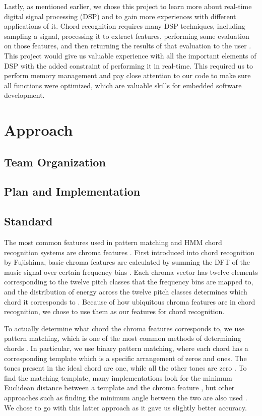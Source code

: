 \documentclass[journal]{IEEEtran}
\begin{document}
Lastly, as mentioned earlier, we chose this project to learn more about real-time digital signal processing (DSP) and to gain more experiences with different applications of it.
Chord recognition requires many DSP techniques, including sampling a signal, processing it to extract features, performing some evaluation on those features, and then returning the results of that evaluation to the user \cite{fujishima}.
This project would give us valuable experience with all the important elements of DSP with the added constraint of performing it in real-time.
This required us to perform memory management and pay close attention to our code to make sure all functions were optimized, which are valuable skills for embedded software development.

\section{Approach}
\subsection{Team Organization}

\subsection{Plan and Implementation}

\subsection{Standard}
The most common features used in pattern matching and HMM chord recognition systems are chroma features \cite{cho_chroma}.
First introduced into chord recognition by Fujishima, basic chroma features are calculated by summing the DFT of the music signal over certain frequency bins \cite{fujishima}.
Each chroma vector has twelve elements corresponding to the twelve pitch classes that the frequency bins are mapped to, and the distribution of energy across the twelve pitch classes determines which chord it corresponds to \cite{jiang}.
Because of how ubiquitous chroma features are in chord recognition, we chose to use them as our features for chord recognition.

To actually determine what chord the chroma features corresponds to, we use pattern matching, which is one of the most common methods of determining chords \cite{cho_chroma}.
In particular, we use binary pattern matching, where each chord has a corresponding template which is a specific arrangement of zeros and ones.
The tones present in the ideal chord are one, while all the other tones are zero \cite{cho_chroma}.
To find the matching template, many implementations look for the minimum Euclidean distance between a template and the chroma feature \cite{stark}, but other approaches such as finding the minimum angle between the two are also used \cite{jiang}.
We chose to go with this latter approach as it gave us slightly better accuracy.
\end{document}
